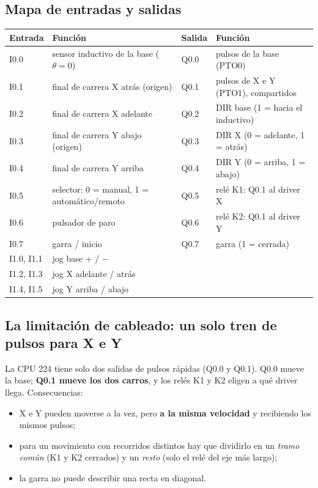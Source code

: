 \documentclass[a4paper,11pt]{article}
\begin{document}
\subsection{Mapa de entradas y salidas}
\begin{center}\small
\begin{tabularx}{\linewidth}{>{\ttfamily}p{1.1cm} >{\raggedright}X >{\ttfamily}p{1.1cm} >{\raggedright\arraybackslash}X}
\toprule
\textbf{\rmfamily Entrada} & \textbf{Función} & \textbf{\rmfamily Salida} & \textbf{Función}\\
\midrule
I0.0 & sensor inductivo de la base ($\theta = 0$) & Q0.0 & pulsos de la base (PTO0)\\
I0.1 & final de carrera X atrás (origen) & Q0.1 & pulsos de X e Y (PTO1), compartidos\\
I0.2 & final de carrera X adelante & Q0.2 & DIR base (1 = hacia el inductivo)\\
I0.3 & final de carrera Y abajo (origen) & Q0.3 & DIR X (0 = adelante, 1 = atrás)\\
I0.4 & final de carrera Y arriba & Q0.4 & DIR Y (0 = arriba, 1 = abajo)\\
I0.5 & selector: 0 = manual, 1 = automático/remoto & Q0.5 & relé K1: Q0.1 al driver X\\
I0.6 & pulsador de paro & Q0.6 & relé K2: Q0.1 al driver Y\\
I0.7 & garra / inicio & Q0.7 & garra (1 = cerrada)\\
I1.0, I1.1 & jog base + / $-$ & & \\
I1.2, I1.3 & jog X adelante / atrás & & \\
I1.4, I1.5 & jog Y arriba / abajo & & \\
\bottomrule
\end{tabularx}
\end{center}

\subsection{La limitación de cableado: un solo tren de pulsos para X e Y}
La CPU 224 tiene solo dos salidas de pulsos rápidas (Q0.0 y Q0.1). Q0.0 mueve la base; \textbf{Q0.1 mueve los dos carros}, y los relés K1 y K2 eligen a qué driver llega. Consecuencias:
\begin{itemize}
\item X e Y pueden moverse a la vez, pero \textbf{a la misma velocidad} y recibiendo los mismos pulsos;
\item para un movimiento con recorridos distintos hay que dividirlo en un \emph{tramo común} (K1 y K2 cerrados) y un \emph{resto} (solo el relé del eje más largo);
\item la garra no puede describir una recta en diagonal.
\end{itemize}
\end{document}
